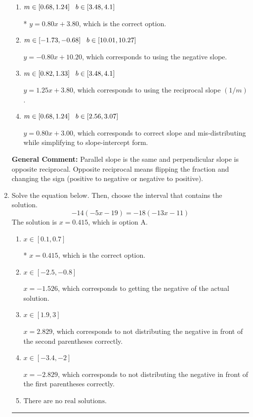 \documentclass{extbook}[14pt]
\newcommand{\litem}[1]{\item #1

\rule{\textwidth}{0.4pt}}
\begin{document}
\begin{enumerate}
{\begin{enumerate}[label=\Alph*.]
 $y = 0.80x - 3.80$, which corresponds to using the correct slope and getting the negative $y$-intercept.
\item \( m \in [0.68, 1.24] \hspace*{3mm} b \in [3.48, 4.1] \)

* $y = 0.80x + 3.80$, which is the correct option.
\item \( m \in [-1.73, -0.68] \hspace*{3mm} b \in [10.01, 10.27] \)

 $y = -0.80x + 10.20$, which corresponds to using the negative slope.
\item \( m \in [0.82, 1.33] \hspace*{3mm} b \in [3.48, 4.1] \)

 $y = 1.25x + 3.80$, which corresponds to using the reciprocal slope $(1/m)$.
\item \( m \in [0.68, 1.24] \hspace*{3mm} b \in [2.56, 3.07] \)

 $y = 0.80x + 3.00$, which corresponds to correct slope and mis-distributing while simplifying to slope-intercept form.
\end{enumerate}

\textbf{General Comment:} Parallel slope is the same and perpendicular slope is opposite reciprocal. Opposite reciprocal means flipping the fraction and changing the sign (positive to negative or negative to positive).
}
\litem{
Solve the equation below. Then, choose the interval that contains the solution.
\[ -14(-5x -19) = -18(-13x -11) \]The solution is \( x = 0.415 \), which is option A.\begin{enumerate}[label=\Alph*.]
\item \( x \in [0.1, 0.7] \)

* $x = 0.415$, which is the correct option.
\item \( x \in [-2.5, -0.8] \)

$x = -1.526$, which corresponds to getting the negative of the actual solution.
\item \( x \in [1.9, 3] \)

$x = 2.829$, which corresponds to not distributing the negative in front of the second parentheses correctly.
\item \( x \in [-3.4, -2] \)

$x = -2.829$, which corresponds to not distributing the negative in front of the first parentheses correctly.
\item \( \text{There are no real solutions.} \)


\end{enumerate}}
\end{enumerate}
\end{document}
